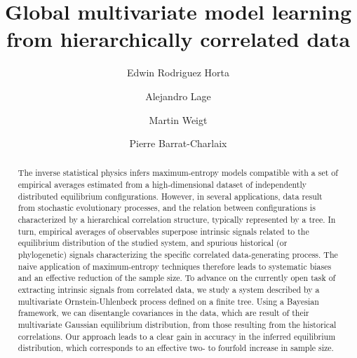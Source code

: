\documentclass[preprint,amsmath,amssymb,superscriptaddress,showpacs,pre]{revtex4-1}
\begin{document}
\title{Global multivariate model learning from hierarchically correlated data}

\author{Edwin Rodriguez Horta} 
%
\author{Alejandro Lage} 
%
\author{Martin Weigt} 
% 

\author{Pierre Barrat-Charlaix} 




\begin{abstract}
The inverse statistical physics infers maximum-entropy models compatible with a set of empirical averages estimated from a high-dimensional dataset of independently distributed equilibrium configurations. However, in several applications, data result from stochastic evolutionary processes, and the relation between configurations is characterized by a hierarchical correlation structure, typically represented by a tree. In turn, empirical averages of observables superpose intrinsic signals related to the equilibrium distribution of the studied system, and spurious historical (or phylogenetic) signals characterizing the specific correlated data-generating process. The naive application of maximum-entropy techniques therefore leads to systematic biases and an effective reduction of the sample size. To advance on the currently open task of extracting intrinsic signals from correlated data, we study a system described by a multivariate Ornstein-Uhlenbeck process defined on a finite tree. Using a Bayesian framework, we can disentangle covariances in the data, which are result of their multivariate Gaussian equilibrium distribution, from those resulting from the historical correlations. Our approach leads to a clear gain in accuracy in the inferred equilibrium distribution, which corresponds to an effective two- to fourfold increase in sample size.
\end{abstract}
\end{document}
